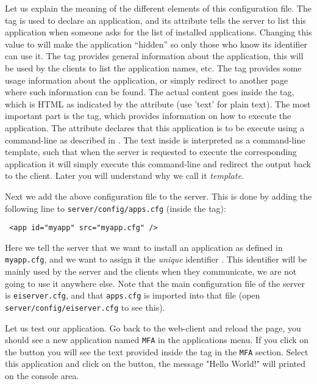 \medskip
\noindent
Let us explain the meaning of the different elements of this
configuration file.
%
The  tag is used to declare an \ei application, and its
 attribute tells the server to list this application when
someone asks for the list of installed applications. Changing this
value to  will make the application ``hidden'' so only
those who know its identifier can use it.
%
The  tag provides general information about the
application, this will be used by the clients to list the application
names, etc.
%
The  tag provides some usage information about the
application, or simply redirect to another page where such information
can be found. The actual content goes inside the  tag,
which is HTML as indicated by the  attribute (use 'text'
for plain text).
%
The most important part is the  tag, which provides
information on how to execute the application. The attribute
 declares that this application is to be execute using a
command-line as described in .
%
The text inside  is interpreted as a command-line
template, such that when the server is requested to execute the
corresponding application it will simply execute this command-line and
redirect the output back to the client. Later you will understand why
we call it \emph{template}.

Next we add the above configuration file to the server. This is done
by adding the following line to \texttt{server/config/apps.cfg}
(inside the  tag):

\medskip
\begin{lstlisting}
 <app id="myapp" src="myapp.cfg" />
\end{lstlisting}

\medskip
\noindent
Here we tell the server that we want to install an application as
defined in \texttt{myapp.cfg}, and we want to assign it the
\emph{unique} identifier . This identifier will be mainly
used by the server and the clients when they communicate, we are not
going to use it anywhere else.
%
Note that the main configuration file of the \ei server is
\texttt{eiserver.cfg}, and that \texttt{apps.cfg} is imported into
that file (open \texttt{server/config/eiserver.cfg} to see this).

Let us test our application. Go back to the web-client and reload the
page, you should see a new application named \texttt{MFA} in the
applications menu. If you click on the \helpbutton button you will see
the text provided inside the  tag in the \texttt{MFA}
section.
%
Select this application and click on the \applybutton button, the
message "Hello World!" will printed on the console area.


